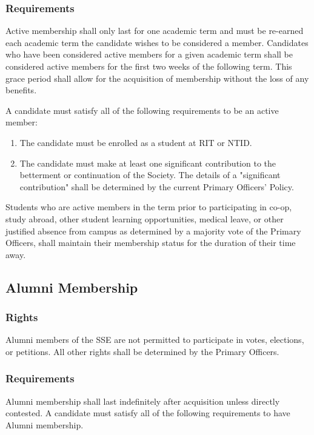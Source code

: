 \documentclass[american]{article}
\begin{document}
\subsubsection{Requirements}
Active membership shall only last for one academic term and must be re-earned each academic term the candidate wishes to be considered a member. Candidates who have been considered active members for a given academic term shall be considered active members for the first two weeks of the following term. This grace period shall allow for the acquisition of membership without the loss of any benefits.

A candidate must satisfy all of the following requirements to be an active member: 

\begin{enumerate}
\item The candidate must be enrolled as a student at RIT or NTID.
\item The candidate must make at least one significant contribution to the betterment or continuation of the Society. The details of a "significant contribution" shall be determined by the current Primary Officers' Policy.
\end{enumerate}

Students who are active members in the term prior to participating in co-op, study abroad, other student learning opportunities, medical leave, or other justified absence from campus as determined by a majority vote of the Primary Officers, shall maintain their membership status for the duration of their time away.

\subsection{Alumni Membership}

\subsubsection{Rights}
Alumni members of the SSE are not permitted to participate in votes, elections, or petitions. All other rights shall be determined by the Primary Officers.

\subsubsection{Requirements}
Alumni membership shall last indefinitely after acquisition unless directly contested. A candidate must satisfy all of the following requirements to have Alumni membership. 
\end{document}
